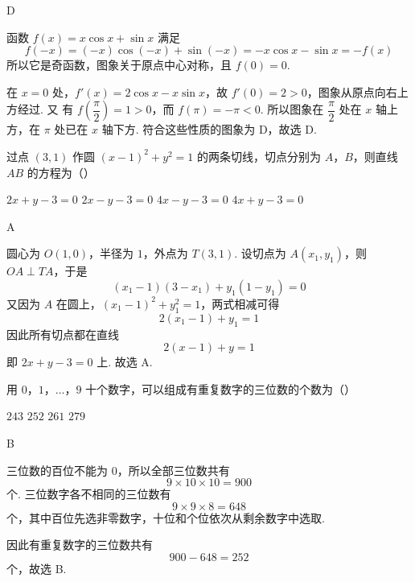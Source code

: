\begin{answer}
D
\end{answer}

\begin{solution}
函数 \(f(x)=x\cos x+\sin x\) 满足
\[
f(-x)=(-x)\cos(-x)+\sin(-x)=-x\cos x-\sin x=-f(x)
\]
所以它是奇函数，图象关于原点中心对称，且 \(f(0)=0\).

在 \(x=0\) 处，\(f'(x)=2\cos x-x\sin x\)，故 \(f'(0)=2>0\)，图象从原点向右上方经过. 又
有 \(f\left(\dfrac{\pi}{2}\right)=1>0\)，而 \(f(\pi)=-\pi<0\).
所以图象在 \(\dfrac{\pi}{2}\) 处在 \(x\) 轴上方，在 \(\pi\) 处已在 \(x\) 轴下方. 符合这些性质的图象为 D，故选 D.
\end{solution}

\begin{problem}
过点 \((3,1)\) 作圆 \((x - 1)^2 + y^2 = 1\) 的两条切线，切点分别为 \(A\)，\(B\)，则直线 \(AB\) 的方程为（\quad）

\choices
    {\(2x + y - 3 = 0\)}
    {\(2x - y - 3 = 0\)}
    {\(4x - y - 3 = 0\)}
    {\(4x + y - 3 = 0\)}
\end{problem}

\begin{answer}
A
\end{answer}

\begin{solution}
圆心为 \(O(1,0)\)，半径为 \(1\)，外点为 \(T(3,1)\). 设切点为 \(A(x_1,y_1)\)，则 \(OA\perp TA\)，于是
\[
(x_1-1)(3-x_1)+y_1(1-y_1)=0
\]
又因为 \(A\) 在圆上，\((x_1-1)^2+y_1^2=1\)，两式相减可得
\[
2(x_1-1)+y_1=1
\]
因此所有切点都在直线
\[
2(x-1)+y=1
\]
即 \(2x+y-3=0\) 上. 故选 A.
\end{solution}

\begin{problem}
用 \(0\)，\(1\)，\(\ldots\)，\(9\) 十个数字，可以组成有重复数字的三位数的个数为（\quad）

\choices
    {\(243\)}
    {\(252\)}
    {\(261\)}
    {\(279\)}
\end{problem}

\begin{answer}
B
\end{answer}

\begin{solution}
三位数的百位不能为 \(0\)，所以全部三位数共有
\[
9\times10\times10=900
\]
个. 三位数字各不相同的三位数有
\[
9\times9\times8=648
\]
个，其中百位先选非零数字，十位和个位依次从剩余数字中选取.

因此有重复数字的三位数共有
\[
900-648=252
\]
个，故选 B.
\end{solution}

